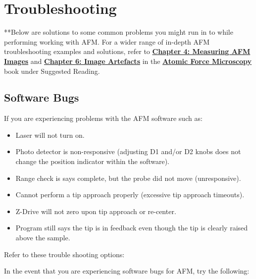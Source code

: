 \documentclass{../lab}
\begin{document}
\section{Troubleshooting}
\label{sec:Troubleshooting}

**Below are solutions to some common problems you might run in to while performing working with AFM.  For a wider range of in-depth AFM troubleshooting examples and solutions, refer to \href{http://experimentationlab.berkeley.edu/sites/default/files/AFMImages/Ch-4-Measuring_AFM_images.pdf}{\textbf{Chapter 4: Measuring AFM Images}} and \href{http://experimentationlab.berkeley.edu/sites/default/files/AFMImages/Ch-6-AFM_image_artefacts.pdf}{\textbf{Chapter 6: Image Artefacts}} in the \href{http://experimentationlab.berkeley.edu/afm-book}{\textbf{Atomic Force Microscopy}} book under Suggested Reading.

\subsection{Software Bugs}

If you are experiencing problems with the AFM software such as:

\begin{itemize}
    \item Laser will not turn on.

    \item Photo detector is non-responsive (adjusting D1 and/or D2 knobs does not change the position indicator within the software).

    \item Range check is says complete, but the probe did not move (unresponsive).

    \item Cannot perform a tip approach properly (excessive tip approach timeouts).

    \item Z-Drive will not zero upon tip approach or re-center.

    \item Program still says the tip is in feedback even though the tip is clearly raised above the sample.

\end{itemize}

Refer to these trouble shooting options:

In the event that you are experiencing software bugs for AFM, try the following:
\end{document}
